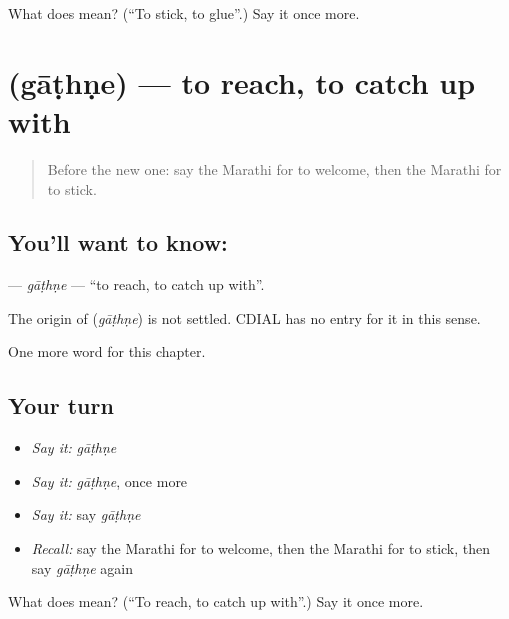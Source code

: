\begin{tcolorbox}[breakable,colback=teal!4,colframe=teal!35!black,title={Before you move on}]
What does  mean? (\textquotedblleft{}To stick, to glue\textquotedblright{}.) Say it once more.
\end{tcolorbox}
\section[\texorpdfstring{\mr{गाठणे} (gāṭhṇe)}{गाठणे (gāṭhṇe)}]{ (gāṭhṇe) — to reach, to catch up with}

\label{lesson:MR-C199-gathne}



\begin{quote}
Before the new one: say the Marathi for to welcome, then the Marathi for to stick.
\end{quote}

\subsection*{You'll want to know: }
\textbf{} — \emph{gāṭhṇe} — \textquotedblleft{}to reach, to catch up with\textquotedblright{}.

\begin{cousinweb}
The origin of \textbf{} (\emph{gāṭhṇe}) is not settled. CDIAL has no entry for it in this sense.
\end{cousinweb}

\begin{grammarlens}[title={What you've built}]
One more word for this chapter.
\end{grammarlens}

\subsection*{Your turn}
\begin{itemize}
\raggedright
  \item \emph{Say it:} \emph{gāṭhṇe}
  \item \emph{Say it:} \emph{gāṭhṇe}, once more
  \item \emph{Say it:} say \emph{gāṭhṇe}
  \item \emph{Recall:} say the Marathi for to welcome, then the Marathi for to stick, then say \emph{gāṭhṇe} again
\end{itemize}

\begin{tcolorbox}[breakable,colback=teal!4,colframe=teal!35!black,title={Before you move on}]
What does  mean? (\textquotedblleft{}To reach, to catch up with\textquotedblright{}.) Say it once more.
\end{tcolorbox}
